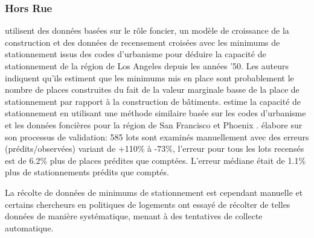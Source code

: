         \subsubsection{Hors Rue}
              \textcite{chester_parking_2015} utilisent des données basées sur le rôle foncier, un modèle de croissance de la construction et des données de recensement croisées avec les minimums de stationnement issus des codes d'urbanisme pour déduire la capacité de stationnement de la région de Los Angeles depuis les années '50. Les auteurs indiquent qu'ils estiment que les minimums mis en place sont probablement le nombre de places construites du fait de la valeur marginale basse de la place de stationnement par rapport à la construction de bâtiments. \citeauthor{chester_inventorying_2022} estime la capacité de stationnement en utilisant une méthode similaire basée sur les codes d'urbanisme et les données foncières pour la région de San Francisco \parencite{chester_inventorying_2022} et Phoenix \parencite{hoehne_valley_2019}. \textcite{hoehne_valley_2019} élabore sur son processus de validation: 585 lots sont examinés manuellement avec des erreurs (prédits/observées) variant de +110\% à -73\%, l'erreur pour tous les lots recensés est de 6.2\% plus de places prédites que comptées. L'erreur médiane était de 1.1\% plus de stationnements prédits que comptés.\par
            La récolte de données de minimums de stationnement est cependant manuelle et certains chercheurs en politiques de logements ont essayé de récolter de telles données de manière systématique, menant à des tentatives de collecte automatique.
